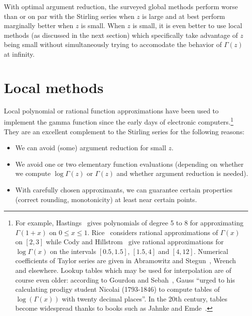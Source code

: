 \documentclass[reqno]{amsart}
\theoremstyle{definition}
\begin{document}
With optimal argument reduction, the surveyed global methods
perform worse than or on par with the Stirling series when $z$ is large
and at best perform marginally better
when $z$ is small.
When $z$ is small, it is even better
to use local methods (as discussed in the next section)
which specifically take advantage of $z$ being small
without simultaneously trying to accomodate the behavior of $\Gamma(z)$ at infinity.



\section{Local methods}

\label{sect:local}

Local polynomial or rational function approximations
have been used to implement
the gamma function since the early days of electronic computers.\footnote{For example, Hastings~\cite{hastings1955approximations}
gives polynomials of degree 5 to 8 for approximating $\Gamma(1+x)$ on $0 \le x \le 1$.
Rice~\cite{Rice1964} considers rational approximations of $\Gamma(x)$ on $[2, 3]$
while Cody and Hillstrom~\cite{Cody1967}
give rational approximations for $\log \Gamma(x)$ on the intervals $[0.5, 1.5]$, $[1.5, 4]$ and $[4, 12]$.
Numerical coefficients of Taylor series are given in Abramowitz and Stegun~\cite{AbramowitzStegun1964}, Wrench~\cite{Wrench1968} and elsewhere.
Lookup tables which may be used for interpolation
are of course even older: according to Gourdon and Sebah~\cite{sebah2002introduction},
Gauss ``urged to his calculating prodigy student Nicolai (1793-1846) to compute tables of $\log(\Gamma(x))$ with twenty decimal places''.
In the 20th century, tables become widespread thanks to books such as Jahnke and Emde~\cite{jahnke1909funktionentafeln}.}
They are an excellent complement to the Stirling series for the following reasons:

\begin{itemize}
\item We can avoid (some) argument reduction for small $z$.
\item We avoid one or two elementary function evaluations (depending on whether we compute $\log \Gamma(z)$ or $\Gamma(z)$ and whether argument reduction is needed).
\item With carefully chosen approximants, we can guarantee certain properties (correct rounding, monotonicity) at least near certain points.
\end{itemize}
\end{document}
